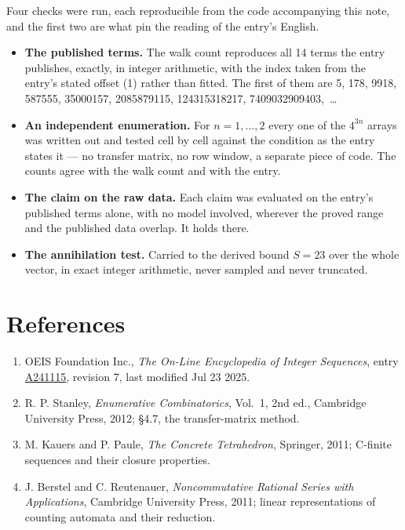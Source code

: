 \documentclass[11pt]{article}
\theoremstyle{definition}
\begin{document}
Four checks were run, each reproducible from the code accompanying this note, and the first two are what pin the reading of the entry's English.

\begin{itemize}

\item {\bfseries The published terms.} The walk count reproduces all 14 terms the entry publishes, exactly, in integer arithmetic, with the index taken from the entry's stated offset (1) rather than fitted. The first of them are 5, 178, 9918, 587555, 35000157, 2085879115, 124315318217, 7409032909403,~\dots

\item {\bfseries An independent enumeration.} For $n = 1,\dots,2$ every one of the $4^{3n}$ arrays was written out and tested cell by cell against the condition as the entry states it --- no transfer matrix, no row window, a separate piece of code. The counts agree with the walk count and with the entry.

\item {\bfseries The claim on the raw data.} Each claim was evaluated on the entry's published terms alone, with no model involved, wherever the proved range and the published data overlap. It holds there.

\item {\bfseries The annihilation test.} Carried to the derived bound $S = 23$ over the whole vector, in exact integer arithmetic, never sampled and never truncated.

\end{itemize}

\section{References}

\begin{enumerate}

\item OEIS Foundation Inc., \emph{The On-Line Encyclopedia of Integer Sequences}, entry \href{https://oeis.org/A241115}{A241115}, revision 7, last modified Jul 23 2025.

\item R. P. Stanley, \emph{Enumerative Combinatorics}, Vol.~1, 2nd ed., Cambridge University Press, 2012; \S4.7, the transfer-matrix method.

\item M. Kauers and P. Paule, \emph{The Concrete Tetrahedron}, Springer, 2011; C-finite sequences and their closure properties.

\item J. Berstel and C. Reutenauer, \emph{Noncommutative Rational Series with Applications}, Cambridge University Press, 2011; linear representations of counting automata and their reduction.

\end{enumerate}
\end{document}
